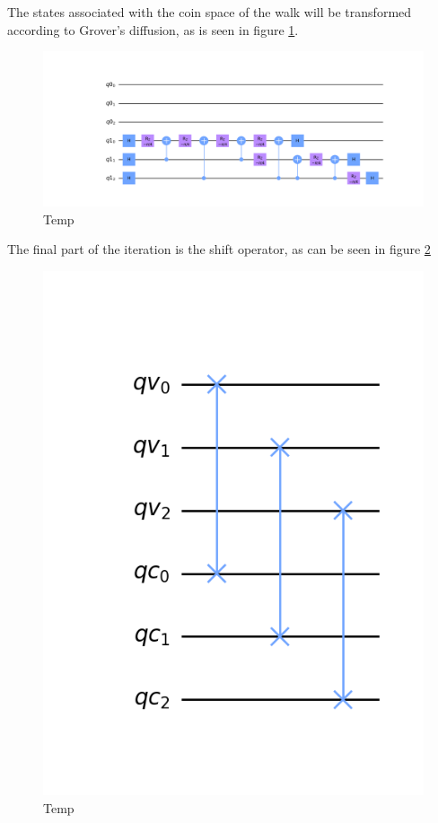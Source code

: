 \documentclass[../../dissertation.tex]{subfiles}
\begin{document}
The states associated with the coin space of the walk will be transformed according to Grover's diffusion, as is seen in figure \ref{fig:coinedQWSearchDiffCircuitQistkit}.
\begin{figure}[!h]
	\centering
	\includegraphics[scale=0.27]{img/Qiskit/CoinedQuantumWalk/Search/Circuits/CoinedSearchQiskitCircDiff_N3_M4_S5.png}
	\caption{Temp} 
	\label{fig:coinedQWSearchDiffCircuitQistkit}
\end{figure}\par
The final part of the iteration is the shift operator, as can be seen in figure \ref{fig:coinedQWSearchShiftCircuitQistkit}
\begin{figure}[!h]
	\centering
	\includegraphics[scale=0.27]{img/Qiskit/CoinedQuantumWalk/Search/Circuits/CoinedSearchQiskitCircShift_N3_M4_S5.png}
	\caption{Temp} 
	\label{fig:coinedQWSearchShiftCircuitQistkit}
\end{figure}
\end{document}
